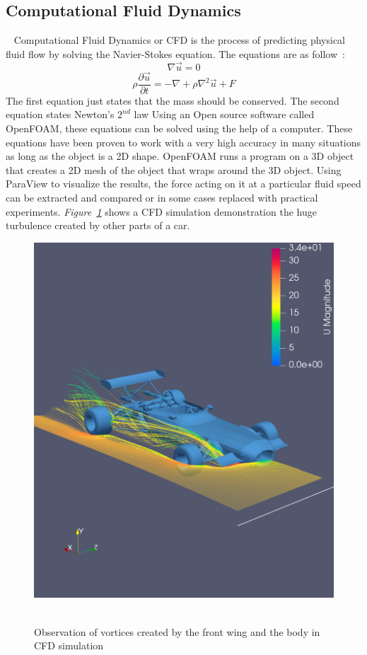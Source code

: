 \documentclass[11pt, a4paper]{article}
\begin{document}
\subsection{Computational Fluid Dynamics}~\label{sec:CFD}
Computational Fluid Dynamics or CFD is the process of predicting physical fluid flow by solving the Navier-Stokes equation. The equations are as follow~\cite{9}:
\begin{equation*}   
\nabla \vec{u}=0
\end{equation*}
\begin{equation*}   
\rho \frac{\partial \vec{u}}{\partial t}=-\nabla + \rho \nabla^2\vec{u} + F
\end{equation*}
The first equation just states that the mass should be conserved. The second equation states Newton's $2^{nd}$ law
Using an Open source software called OpenFOAM, these equations can be solved using the help of a computer. These equations have been proven to work with a very high accuracy in many situations as long as the object is a 2D shape.
OpenFOAM runs a program on a 3D object that creates a 2D mesh of the object that wraps around  the 3D object. Using ParaView to visualize the results, the force acting on it at a particular fluid speed can be extracted and compared or in some cases replaced with practical experiments.
\textit{Figure~\ref{fig:turbulence}} shows a CFD simulation demonstration the huge turbulence created by other parts of a car.

\begin{figure}[H]
    \caption{Observation of vortices created by the front wing and the body in CFD simulation} 
    \centering 
    \includegraphics[width=\textwidth]{images/cfd/proofOfWake.png}
~\label{fig:turbulence}
\end{figure} 
\end{document}
